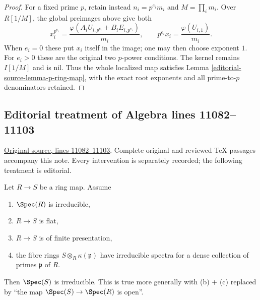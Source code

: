 \begin{proof}
For a fixed prime $p$, retain
instead $n_i=p^{e_i}m_i$ and
$M=\prod_i m_i$. Over $R[1/M]$,
the global preimages above give
both
$$
x_i^{p^{e_i}}=
\frac{\varphi(A_iU_{i,p^{e_i}}+B_iE_{i,p^{e_i}})}{m_i},
\qquad
p^{e_i}x_i=\frac{\varphi(U_{i,1})}{m_i}.
$$
When $e_i=0$ these put $x_i$
itself in the image; one may
then choose exponent $1$.
For $e_i>0$ these are the
original two $p$-power conditions.
The kernel remains $I[1/M]$
and is nil. Thus the whole
localized map satisfies Lemma
\ref{editorial-source-lemma-p-ring-map}, with the
exact root exponents and all
prime-to-$p$ denominators retained.
\end{proof}


\subsection{Editorial treatment of Algebra lines 11082--11103}

\hypertarget{algebra-context-136}{}

\noindent\href{https://github.com/stacks/stacks-project/blob/a04446e57ec1fbc252a871afcec7752fb2807b14/algebra.tex\#L11082}{Original source, lines 11082--11103}. Complete original and reviewed TeX passages accompany this note. Every intervention is separately recorded; the following treatment is editorial.


\begin{lemma}
\label{editorial-source-lemma-flat-fibres-irreducible}
Let $R \to S$ be a ring map. Assume
\begin{enumerate}
\item[(a)] $\Spec(R)$ is irreducible,
\item[(b)] $R \to S$ is flat,
\item[(c)] $R \to S$ is of finite presentation,
\item[(d)] the fibre rings $S \otimes_R \kappa(\mathfrak p)$
have irreducible spectra for a dense collection of primes $\mathfrak p$ of $R$.
\end{enumerate}
Then $\Spec(S)$ is irreducible.
This is true more generally with (b) $+$ (c)
replaced by ``the map $\Spec(S) \to \Spec(R)$ is open''.
\end{lemma}

